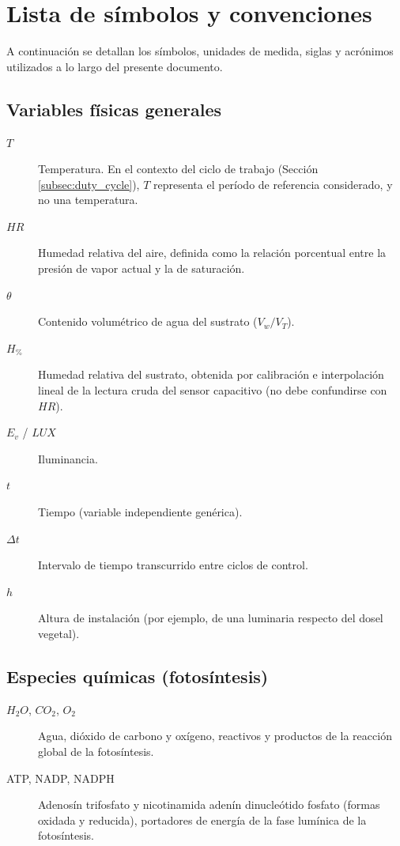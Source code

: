 \chapter*{Lista de símbolos y convenciones}
A continuación se detallan los símbolos, unidades de medida, siglas y acrónimos utilizados a lo largo del presente documento.

\section*{Variables físicas generales}
\begin{description}
    \item[$T$] Temperatura. En el contexto del ciclo de trabajo (Sección \ref{subsec:duty_cycle}), $T$ representa el período de referencia considerado, y no una temperatura.
    \item[$HR$] Humedad relativa del aire, definida como la relación porcentual entre la presión de vapor actual y la de saturación.
    \item[$\theta$] Contenido volumétrico de agua del sustrato ($V_w / V_T$).
    \item[$H_{\%}$] Humedad relativa del sustrato, obtenida por calibración e interpolación lineal de la lectura cruda del sensor capacitivo (no debe confundirse con $HR$).
    \item[$E_v$ / $LUX$] Iluminancia.
    \item[$t$] Tiempo (variable independiente genérica).
    \item[$\Delta t$] Intervalo de tiempo transcurrido entre ciclos de control.
    \item[$h$] Altura de instalación (por ejemplo, de una luminaria respecto del dosel vegetal).
\end{description}

\section*{Especies químicas (fotosíntesis)}
\begin{description}
    \item[$H_2O$, $CO_2$, $O_2$] Agua, dióxido de carbono y oxígeno, reactivos y productos de la reacción global de la fotosíntesis.
    \item[ATP, NADP, NADPH] Adenosín trifosfato y nicotinamida adenín dinucleótido fosfato (formas oxidada y reducida), portadores de energía de la fase lumínica de la fotosíntesis.
\end{description}

